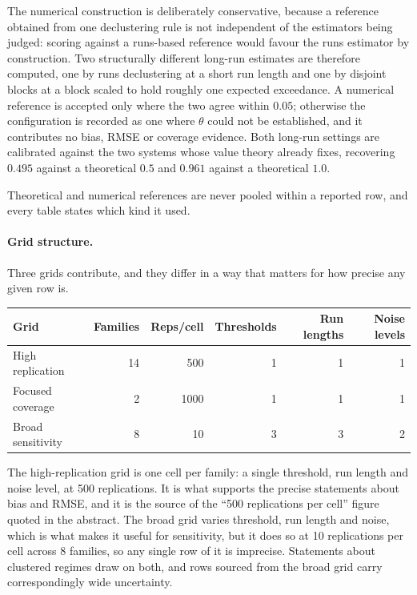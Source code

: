 The numerical construction is deliberately conservative, because a reference obtained from one declustering rule is not independent of the estimators being judged: scoring against a runs-based reference would favour the runs estimator by construction. Two structurally different long-run estimates are therefore computed, one by runs declustering at a short run length and one by disjoint blocks at a block scaled to hold roughly one expected exceedance. A numerical reference is accepted only where the two agree within \(0.05\); otherwise the configuration is recorded as one where \(\theta\) could not be established, and it contributes no bias, RMSE or coverage evidence. Both long-run settings are calibrated against the two systems whose value theory already fixes, recovering \(0.495\) against a theoretical \(0.5\) and \(0.961\) against a theoretical \(1.0\).

Theoretical and numerical references are never pooled within a reported row, and every table states which kind it used.

\paragraph{Grid structure.} Three grids contribute, and they differ in a way that matters for how precise any given row is.

\begin{center}
\begin{tabular}{lrrrrr}
\toprule
Grid & Families & Reps/cell & Thresholds & Run lengths & Noise levels \\
\midrule
High replication & 14 & 500 & 1 & 1 & 1 \\
Focused coverage & 2 & 1000 & 1 & 1 & 1 \\
Broad sensitivity & 8 & 10 & 3 & 3 & 2 \\
\bottomrule
\end{tabular}
\end{center}

The high-replication grid is one cell per family: a single threshold, run length and noise level, at 500 replications. It is what supports the precise statements about bias and RMSE, and it is the source of the ``500 replications per cell'' figure quoted in the abstract. The broad grid varies threshold, run length and noise, which is what makes it useful for sensitivity, but it does so at 10 replications per cell across 8 families, so any single row of it is imprecise. Statements about clustered regimes draw on both, and rows sourced from the broad grid carry correspondingly wide uncertainty.

